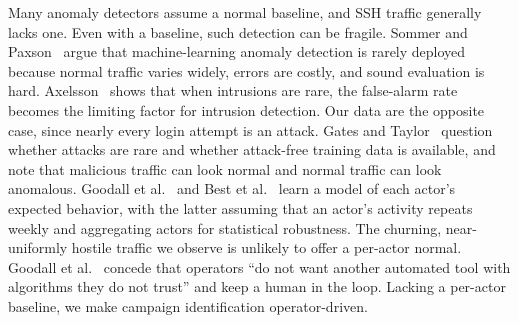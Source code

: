 \documentclass[conference]{IEEEtran}
\begin{document}
Many anomaly detectors assume a normal baseline, and SSH
traffic generally lacks one. Even with a baseline, such detection can be fragile.
Sommer and Paxson~\cite{sommer2010outside} argue that machine-learning anomaly
detection is rarely deployed because normal traffic varies
widely, errors are costly, and sound evaluation is hard.
Axelsson~\cite{axelsson2000base} shows that when intrusions are
rare, the false-alarm rate becomes the limiting factor for intrusion detection. Our
data are the opposite case, since nearly every login attempt is
an attack. Gates and Taylor~\cite{gates2006challenging} question
whether attacks are rare and whether attack-free training data
is available, and note that malicious traffic can look normal and normal traffic can look anomalous.
Goodall et al.~\cite{goodall2018situ} and
Best et al.~\cite{best2011atypical} learn a model of each actor's
expected behavior, with the latter assuming that an actor's activity
repeats weekly and aggregating actors for statistical robustness. The churning, near-uniformly
hostile traffic we observe is unlikely to offer a per-actor normal. Goodall et al.~\cite{goodall2018situ}
concede that operators ``do not want another automated tool
with algorithms they do not trust'' and keep a human in the
loop. Lacking a per-actor baseline, we make campaign
identification operator-driven.
\end{document}
